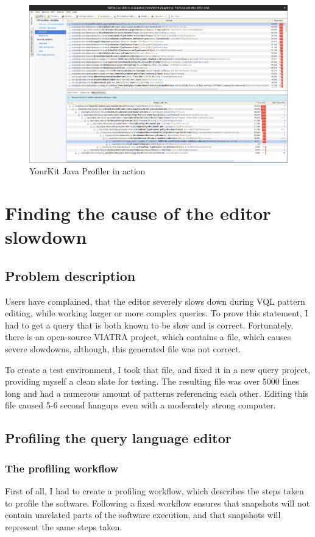 \documentclass[11pt,a4paper,oneside]{report}
\begin{document}
\begin{figure}[ht]
\centering
\includegraphics[width=150mm, keepaspectratio]{figures/yourkit-profiler.png}
\caption{YourKit Java Profiler in action}
\label{fig:yourkit-profiler}
\end{figure}

\chapter{Finding the cause of the editor slowdown}
\section{Problem description}
Users have complained, that the editor severely slows down during VQL pattern
editing, while working larger or more complex queries. To prove this statement,
I had to get a query that is both known to be slow and is correct. Fortunately,
there is an open-source VIATRA project, which contains a file, which causes
severe slowdowns, although, this generated file was not correct.

To create a test environment, I took that file, and fixed it in a new query
project, providing myself a clean slate for testing. The resulting file was over
5000 lines long and had a numerous amount of patterns referencing each other.
Editing this file caused 5-6 second hangups even with a moderately strong
computer.

\section{Profiling the query language editor}
\subsection{The profiling workflow}
First of all, I had to create a profiling workflow, which describes the steps
taken to profile the software. Following a fixed workflow ensures that snapshots
will not contain unrelated parts of the software execution, and that snapshots
will represent the same steps taken.
\end{document}
